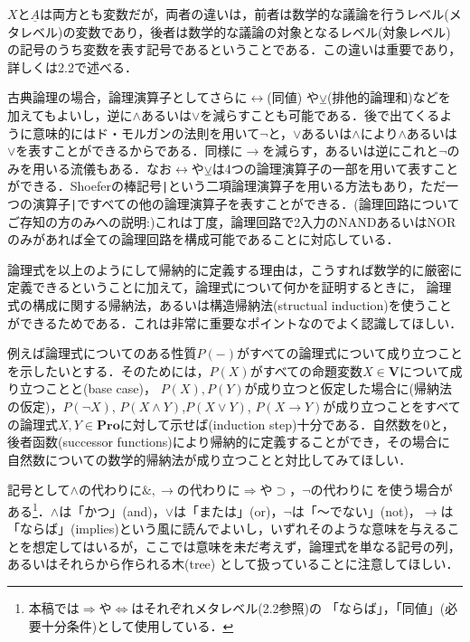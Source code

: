 \documentclass{ltjsarticle}
\theoremstyle{mystyle1}
\theoremstyle{mystyle3}
\theoremstyle{mystyle2}
\newcommand{\uA}{\underline{A}}
\newcommand{\bV}{\ensuremath{\mathbf{V}}}
\newcommand{\bPro}{\ensuremath{\mathbf{Pro}}}
\newcommand{\red}[1]{{\color{red} #1}}
\begin{document}
$X$と$\uA$は両方とも変数だが，両者の違いは，前者は数学的な議論を行うレベル(メタレベル)の変数であり，後者は数学的な議論の対象となるレベル(対象レベル)の記号のうち変数を表す記号であるということである．この違いは重要であり，詳しくは2.2で述べる．

古典論理の場合，論理演算子としてさらに$\leftrightarrow$(同値) や$\veebar$(排他的論理和)などを加えてもよいし，逆に$\wedge$あるいは$\vee$を減らすことも可能である．後で出てくるように意味的にはド・モルガンの法則を用いて$\neg$と，$\vee$あるいは$\wedge$により$\wedge$あるいは$\vee$を表すことができるからである．同様に$\to$を減らす，あるいは逆にこれと$\neg$のみを用いる流儀もある．なお$\leftrightarrow$や$\veebar$は4つの論理演算子の一部を用いて表すことができる．Shoeferの棒記号\verb!|!という二項論理演算子を用いる方法もあり，ただ一つの演算子\verb!|!ですべての他の論理演算子を表すことができる．(論理回路についてご存知の方のみへの説明:)これは丁度，論理回路で2入力のNANDあるいはNORのみがあれば全ての論理回路を構成可能であることに対応している．

論理式を以上のようにして帰納的に定義する理由は，こうすれば数学的に厳密に定義できるということに加えて，論理式について何かを証明するときに，\red{論理式の構成に関する帰納法，あるいは構造帰納法}(structual induction)を使うことができるためである．これは非常に重要なポイントなのでよく認識してほしい．

例えば論理式についてのある性質$P\left(-\right)$がすべての論理式について成り立つことを示したいとする．そのためには，$P\left(X\right)$がすべての命題変数$X\in\bV$について成り立つことと(base case)， $P(X),P(Y)$が成り立つと仮定した場合に(帰納法の仮定)，$P(\neg X)$, $P(X\wedge Y)$,$P(X\vee Y)$, $P(X \to Y)$が成り立つことをすべての論理式$X,Y\in \bPro$に対して示せば(induction step)十分である．自然数を0と，\red{後者函数}(successor functions)により帰納的に定義することができ，その場合に自然数についての数学的帰納法が成り立つことと対比してみてほしい．

記号として$\wedge$の代わりに$\&,\to$の代わりに$\Rightarrow$や$\supset$，$\neg$の代わりに$~$を使う場合がある\footnote{本稿では$\Rightarrow$や$\Leftrightarrow$はそれぞれメタレベル(2.2参照)の 「ならば」，「同値」(必要十分条件)として使用している．}．$\wedge$は「かつ」(and)，$\vee$は「または」(or)，$\neg$は「～でない」(not)，$\to$は「ならば」(implies)という風に読んでよいし，いずれそのような意味を与えることを想定してはいるが，ここでは意味を未だ考えず，論理式を単なる記号の列，あるいはそれらから作られる木(tree) として扱っていることに注意してほしい．
\end{document}
